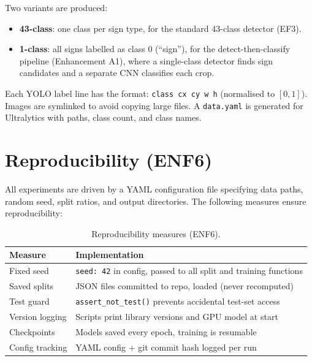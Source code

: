 \documentclass[12pt,a4paper]{article}
\begin{document}
Two variants are produced:
\begin{itemize}[leftmargin=2em, itemsep=2pt]
  \item \textbf{43-class}: one class per sign type, for the standard 43-class detector (EF3).
  \item \textbf{1-class}: all signs labelled as class 0 (``sign''), for the detect-then-classify pipeline (Enhancement A1), where a single-class detector finds sign candidates and a separate CNN classifies each crop.
\end{itemize}

Each YOLO label line has the format: \texttt{class cx cy w h} (normalised to $[0, 1]$). Images are symlinked to avoid copying large files. A \texttt{data.yaml} is generated for Ultralytics with paths, class count, and class names.

\section{Reproducibility (ENF6)}
\label{sec:repro}

All experiments are driven by a YAML configuration file specifying data paths, random seed, split ratios, and output directories. The following measures ensure reproducibility:

\begin{table}[H]
\centering
\renewcommand{\arraystretch}{1.3}
\begin{tabular}{ll}
\toprule
\textbf{Measure} & \textbf{Implementation} \\
\midrule
Fixed seed & \texttt{seed: 42} in config, passed to all split and training functions \\
Saved splits & JSON files committed to repo, loaded (never recomputed) \\
Test guard & \texttt{assert\_not\_test()} prevents accidental test-set access \\
Version logging & Scripts print library versions and GPU model at start \\
Checkpoints & Models saved every epoch, training is resumable \\
Config tracking & YAML config + git commit hash logged per run \\
\bottomrule
\end{tabular}
\caption{Reproducibility measures (ENF6).}
\end{table}
\end{document}
